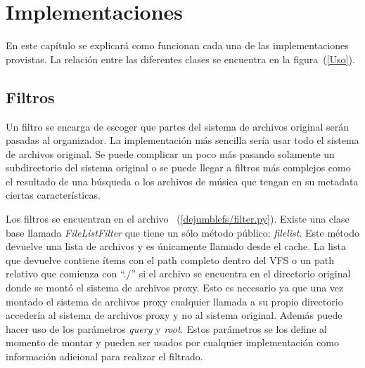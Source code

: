 \chapter{Implementaciones}
\ifpdf
    \graphicspath{{Chapter3/Chapter3Figs/PNG/}{Chapter3/Chapter3Figs/PDF/}{Chapter3/Chapter3Figs/}}
\else
    \graphicspath{{Chapter3/Chapter3Figs/EPS/}{Chapter3/Chapter3Figs/}}
\fi

En este capítulo se explicará como funcionan cada una de las implementaciones provistas. La relación entre las diferentes clases se encuentra en la figura~(\ref{Uso}).




\section{Filtros}

Un filtro se encarga de escoger que partes del sistema de archivos original serán pasadas al organizador. La implementación más sencilla sería usar todo el sistema de archivos original. Se puede complicar un poco más pasando solamente un subdirectorio del sistema original o se puede llegar a filtros más complejos como el resultado de una búsqueda o los archivos de música que tengan en su metadata ciertas características.


Los filtros se encuentran en el archivo ~(\ref{dejumblefs/filter.py}). Existe una clase base llamada \textit{FileListFilter} que tiene un sólo método público: \textit{filelist}. Este método devuelve una lista de archivos y es únicamente llamado desde el cache. La lista que devuelve contiene ítems con el path completo dentro del VFS o un path relativo que comienza con ``./'' si el archivo se encuentra en el directorio original donde se montó el sistema de archivos proxy. Esto es necesario ya que una vez montado el sistema de archivos proxy cualquier llamada a su propio directorio accedería al sistema de archivos proxy y no al sistema original. Además puede hacer uso de los parámetros \textit{query} y \textit{root}. Estos parámetros se los define al momento de montar y pueden ser usados por cualquier implementación como información adicional para realizar el filtrado.

